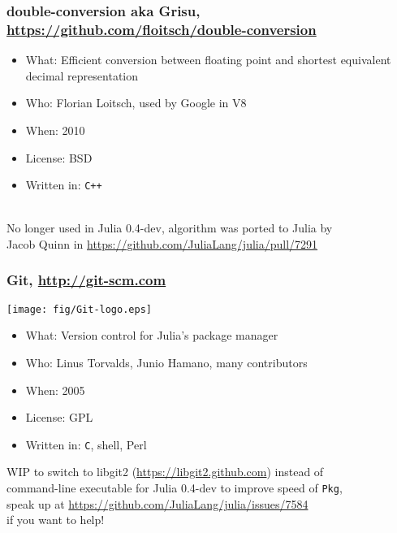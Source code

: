 \documentclass[compressed,dvips,letter]{beamer}
\begin{document}
%
%

\begin{frame}\frametitle{double-conversion aka Grisu, {\small \url{https://github.com/floitsch/double-conversion}}}

\begin{itemize}
\item What: Efficient conversion between floating point and shortest equivalent decimal representation
\item Who: Florian Loitsch, used by Google in V8
\item When: 2010
\item License: BSD
\item Written in: \texttt{C++}
\end{itemize}

~\\
No longer used in Julia 0.4-dev, algorithm was ported to Julia by \\
Jacob Quinn in \url{https://github.com/JuliaLang/julia/pull/7291}

\end{frame}

%
%

\begin{frame}\frametitle{Git, \url{http://git-scm.com}}

\begin{center}
\texttt{[image: fig/Git-logo.eps]}
\end{center}
\vspace{-15pt}
\begin{itemize}
\item What: Version control for Julia's package manager
\item Who: Linus Torvalds, Junio Hamano, many contributors
\item When: 2005
\item License: GPL
\item Written in: \texttt{C}, shell, Perl
\end{itemize}

\vspace{10pt}
WIP to switch to libgit2 (\url{https://libgit2.github.com}) instead of \\
command-line executable for Julia 0.4-dev to improve speed of \texttt{Pkg}, \\
speak up at \url{https://github.com/JuliaLang/julia/issues/7584} \\
if you want to help!

\end{frame}
\end{document}
